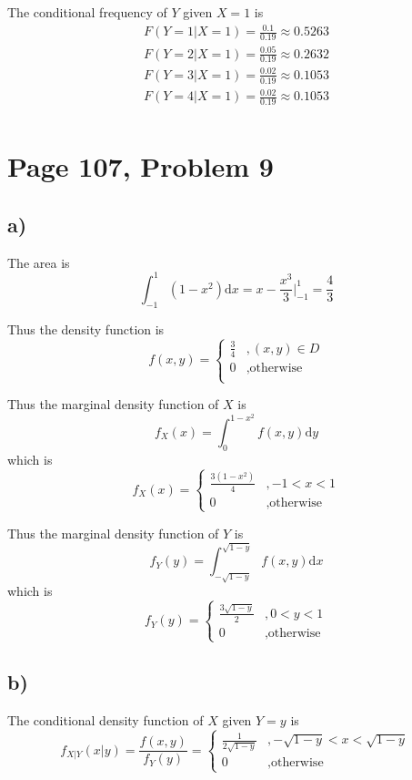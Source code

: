 \documentclass[a4paper, UTF-8]{article}
\theoremstyle{plain}
\begin{document}
The conditional frequency of $Y$ given $X = 1$ is
\begin{align*}
F(Y = 1|X = 1) = \frac{0.1}{0.19} \approx 0.5263\\
F(Y = 2|X = 1) = \frac{0.05}{0.19} \approx 0.2632\\
F(Y = 3|X = 1) = \frac{0.02}{0.19} \approx 0.1053\\
F(Y = 4|X = 1) = \frac{0.02}{0.19} \approx 0.1053\\
\end{align*}

\section{Page 107, Problem 9} 

\subsection{a)} 

The area is 
$$
\int_{-1}^1 (1 - x^2) \mathrm{d}x = x - \frac{x^3}{3} \Big|_{-1}^1 = \frac{4}{3}
$$

Thus the density function is
$$
f(x,y) = \begin{cases}
\frac{3}{4} & , (x,y) \in D \\ 
0 & , \text{otherwise} \\
\end{cases}
$$

Thus the marginal density function of $X$ is
$$
f_X(x) = \int_{0}^{1-x^2} f(x,y) \mathrm{d}y  
$$
which is 
$$
f_X(x) = \begin{cases} 
\frac{3(1-x^2)}{4}&, -1 < x < 1\\
0&, \text{otherwise}
\end{cases}
$$

Thus the marginal density function of $Y$ is
$$
f_Y(y) = \int_{-\sqrt{1-y}}^{\sqrt{1-y}} f(x,y) \mathrm{d}x
$$
which is
$$
f_Y(y) = \begin{cases}
\frac{3\sqrt{1-y}}{2} &, 0 < y < 1\\
0 &, \text{otherwise}
\end{cases}
$$

\subsection{b)} 

The conditional density function of $X$ given $Y = y$ is
$$
f_{X|Y}(x|y) = \frac{f(x,y)}{f_Y(y)} = \begin{cases}
\frac{1}{2\sqrt{1-y}} &, -\sqrt{1-y} < x < \sqrt{1-y}\\
0 &, \text{otherwise}
\end{cases}
$$
\end{document}
